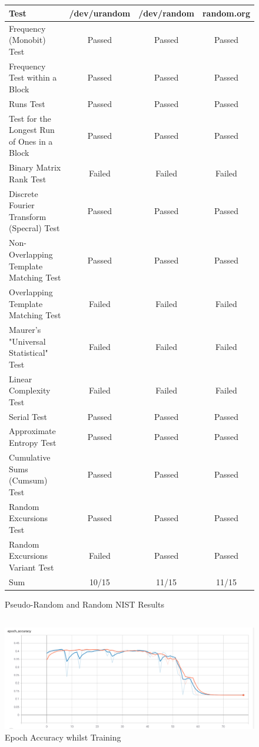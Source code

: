 \documentclass[conference]{IEEEtran}
\begin{document}
\subsection{}
\begin{figure}[H]
    \centering
    \begin{tabular}{l|c|c|c}
        Test & /dev/urandom & /dev/random & random.org \\ \hline
        Frequency (Monobit) Test & Passed & Passed & Passed \\
        Frequency Test within a Block & Passed & Passed & Passed \\
        Runs Test & Passed & Passed & Passed \\
        Test for the Longest Run of Ones in a Block & Passed & Passed & Passed \\
        Binary Matrix Rank Test & Failed & Failed & Failed \\
        Discrete Fourier Transform (Specral) Test & Passed & Passed & Passed \\
        Non-Overlapping Template Matching Test & Passed & Passed & Passed \\
        Overlapping Template Matching Test & Failed & Failed & Failed \\
        Maurer's "Universal Statistical" Test & Failed & Failed & Failed \\
        Linear Complexity Test & Failed & Failed & Failed \\
        Serial Test & Passed & Passed & Passed \\
        Approximate Entropy Test & Passed & Passed & Passed \\
        Cumulative Sums (Cumsum) Test & Passed & Passed & Passed \\
        Random Excursions Test & Passed & Passed & Passed \\
        Random Excursions Variant Test & Failed & Passed & Passed \\ \hline
        Sum & 10/15 & 11/15 & 11/15
        \end{tabular}
    \caption{Pseudo-Random and Random NIST Results}
    \label{fig:nist_random}
\end{figure}

\subsection{}
\begin{figure}[H]
    \centering
    \includegraphics[scale=0.2]{./epoch.png}
    \caption{Epoch Accuracy whilst Training}
    \label{fig:epoch-accuracy}
\end{figure}
\end{document}
